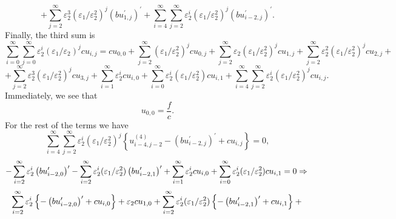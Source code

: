 \documentclass[12pt]{article}
\begin{document}
\begin{equation*}
+\sum_{j=2}^{\infty
}\varepsilon _{2}^{3}(\varepsilon _{1}/\varepsilon _{2}^{2})^{j}\left(
bu_{1,j}^{\prime }\right) ^{\prime }+\sum_{i=4}^{\infty }\sum_{j=2}^{\infty
}\varepsilon _{2}^{i}(\varepsilon _{1}/\varepsilon _{2}^{2})^{j}\left(
bu_{i-2,j}^{\prime }\right) ^{\prime }.
\end{equation*}%
Finally, the third sum is%
\begin{equation*}
\sum_{i=0}^{\infty }\sum_{j=0}^{\infty }\varepsilon _{2}^{i}(\varepsilon
_{1}/\varepsilon _{2})^{j}cu_{i,j}=cu_{0,0}+\sum_{j=2}^{\infty }(\varepsilon
_{1}/\varepsilon _{2}^{2})^{j}cu_{0,j}+\sum_{j=2}^{\infty }\varepsilon
_{2}(\varepsilon _{1}/\varepsilon _{2}^{2})^{j}cu_{1,j}+\sum_{j=2}^{\infty
}\varepsilon _{2}^{2}(\varepsilon _{1}/\varepsilon _{2}^{2})^{j}cu_{2,j}+
\end{equation*}%
\begin{equation*}
+\sum_{j=2}^{\infty }\varepsilon _{2}^{3}(\varepsilon _{1}/\varepsilon
_{2}^{2})^{j}cu_{3,j}+\sum_{i=1}^{\infty }\varepsilon
_{2}^{i}cu_{i,0}+\sum_{i=0}^{\infty }\varepsilon _{2}^{i}(\varepsilon
_{1}/\varepsilon _{2}^{2})cu_{i,1}+\sum_{i=4}^{\infty }\sum_{j=2}^{\infty
}\varepsilon _{2}^{i}(\varepsilon _{1}/\varepsilon _{2}^{2})^{j}cu_{i,j}.
\end{equation*}%
Immediately, we see that%
\begin{equation*}
u_{0,0}=\frac{f}{c}.
\end{equation*}%
For the rest of the terms we have%
\begin{equation*}
\sum_{i=4}^{\infty }\sum_{j=2}^{\infty }\varepsilon _{2}^{i}(\varepsilon
_{1}/\varepsilon _{2}^{2})^{j}\left\{ u_{i-4,j-2}^{(4)}-\left(
bu_{i-2,j}^{\prime }\right) ^{\prime }+cu_{i,j}\right\} =0,
\end{equation*}%
\begin{equation*}
-\sum_{i=2}^{\infty }\varepsilon _{2}^{i}\left( bu_{i-2,0}^{\prime }\right)
^{\prime }-\sum_{i=2}^{\infty }\varepsilon _{2}^{i}(\varepsilon
_{1}/\varepsilon _{2}^{2})\left( bu_{i-2,1}^{\prime }\right) ^{\prime
}+\sum_{i=1}^{\infty }\varepsilon _{2}^{i}cu_{i,0}+\sum_{i=0}^{\infty
}\varepsilon _{2}^{i}(\varepsilon _{1}/\varepsilon _{2}^{2})cu_{i,1}
=0\Rightarrow \\
\end{equation*}%
\begin{equation*}
\sum_{i=2}^{\infty }\varepsilon _{2}^{i}\left\{ -\left( bu_{i-2,0}^{\prime
}\right) ^{\prime }+cu_{i,0}\right\} +\varepsilon
_{2}cu_{1,0}+\sum_{i=2}^{\infty }\varepsilon _{2}^{i}(\varepsilon
_{1}/\varepsilon _{2}^{2})\left\{ -\left( bu_{i-2,1}^{\prime }\right) ^{\prime
}+cu_{i,1}\right\} +\\
\end{equation*}%
\end{document}
